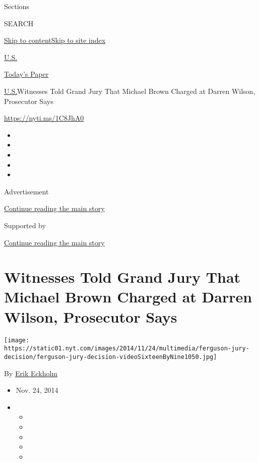 Sections

SEARCH

\protect\hyperlink{site-content}{Skip to
content}\protect\hyperlink{site-index}{Skip to site index}

\href{https://www.nytimes.com/section/us}{U.S.}

\href{https://myaccount.nytimes.com/auth/login?response_type=cookie\&client_id=vi}{}

\href{https://www.nytimes.com/section/todayspaper}{Today's Paper}

\href{/section/us}{U.S.}\textbar{}Witnesses Told Grand Jury That Michael
Brown Charged at Darren Wilson, Prosecutor Says

\url{https://nyti.ms/1C8JhA0}

\begin{itemize}
\item
\item
\item
\item
\item
\end{itemize}

Advertisement

\protect\hyperlink{after-top}{Continue reading the main story}

Supported by

\protect\hyperlink{after-sponsor}{Continue reading the main story}

\hypertarget{witnesses-told-grand-jury-that-michael-brown-charged-at-darren-wilson-prosecutor-says}{%
\section{Witnesses Told Grand Jury That Michael Brown Charged at Darren
Wilson, Prosecutor
Says}\label{witnesses-told-grand-jury-that-michael-brown-charged-at-darren-wilson-prosecutor-says}}

\texttt{[image: https://static01.nyt.com/images/2014/11/24/multimedia/ferguson-jury-decision/ferguson-jury-decision-videoSixteenByNine1050.jpg]}

By \href{http://www.nytimes.com/by/erik-eckholm}{Erik Eckholm}

\begin{itemize}
\item
  Nov. 24, 2014
\item
  \begin{itemize}
  \item
  \item
  \item
  \item
  \item
  \end{itemize}
\end{itemize}

